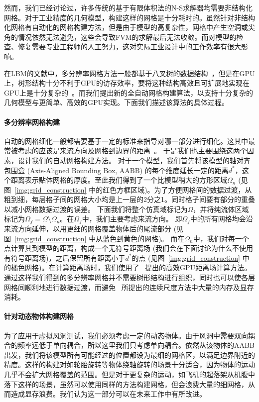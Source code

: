 然而，我们已经讨论过，许多传统的基于有限体积法的N-S求解器均需要非结构化网格。对于工业精度的几何模型，构建这样的网格是十分耗时的。虽然针对非结构化网格有自动化的网格构建方法，但是由于模型的高复杂性，网格中产生空洞或尖角的情况依然无法避免，这些会导致FVM的求解最后无法收敛。而对模型的检查、修复需要专业工程师的人工努力，这对实际工业设计中的工作效率有很大影响。

在LBM的文献中，多分辨率网格方法一般都基于八叉树的数据结构~\citep{EitelAmor-2013,Hasert-2014}，但是在GPU上，树形结构十分不利于GPU的访存效率，要将这种结构高效且可扩展地实现在GPU上是十分复杂的~\citep{Schornbaum-2016, Schornbaum-2018}。而我们提出新的全自动网格构建算法，以支持十分复杂的几何模型与更简单、高效的GPU实现。下面我们描述该算法的具体过程。

\paragraph{多分辨率网格构建}
自动的网格细化一般都需要基于一定的标准来指导对哪一部分进行细化。这其中最常被考虑的应该是来流方向及网格到边界的距离~\citep{Sandoval-2012,Li-2019}。
于是我们也主要围绕这两个因素，设计我们的自动网格构建方法。
对于一个模型，我们首先将该模型的轴对齐包围盒 (Axis-Aligned Bounding Box, AABB) 的每个维度延长一定的距离$d^*$，这个距离表示贴体网格的厚度。至此我们得到了一个比模型稍大的方形区域$\Omega_n$ (见图~\ref{img:grid_construction} 中的红色方框区域)。为了方便网格间的数据过渡，从粗到细，每层格子间的网格大小均是上一层的2分之1。同时格子间要有部分的重叠以减小网格数据过渡的误差。
下面我们将整个仿真域标记为$\Omega$，并将纯流体区域标记为$\Omega_f \!=\! \Omega \setminus \Omega_n$。在$\Omega_f$中，我们主要考虑来流方向。
即$\Omega_f$中的所有网格均会沿来流方向延伸，以用更细的网格覆盖物体后的尾流部分 (见图~\ref{img:grid_construction} 中从蓝色到黄色的网格)。
而在$\Omega_n$中，我们对每一个点计算其到模型的距离，构成一个无符号距离场 (我们会在下面讨论为什么不使用有符号距离场)，之后保留所有距离小于$d^*$的点 (见图~\ref{img:grid_construction} 中的橘色网格)。在计算距离场时，我们使用了~\citet{Imre-2017} 提出的高效GPU距离场计算方法。通过这样我们得到的多分辨率网格并不需要树形结构进行组织，同时也可以使各层网格间顺利地进行数据过渡，而避免~\citet{Li-2019} 所提出的连续尺度方法中大量的内存及显存消耗。

\paragraph{针对动态物体构建网格}
为了应用于虚拟风洞测试，我们必须考虑一定的动态物体。由于风洞中需要双向耦合的频率远低于单向耦合，所以这里我们只考虑单向耦合。依然从该物体的AABB出发，我们将该模型所有可能经过的位置都设为最细的网格区，以满足边界附近的精度。这样的构建对如轮胎旋转等物体绕轴旋转的场景十分适合，因为物体的运动几乎不会扩大网格覆盖的范围。但是对于更复杂的运动，如飞机的起落架从机腹中落下这样的场景，虽然可以使用同样的方法构建网格，但会浪费大量的细网格，从而造成显存浪费。我们认为这一部分可以在未来工作中有所改进。

